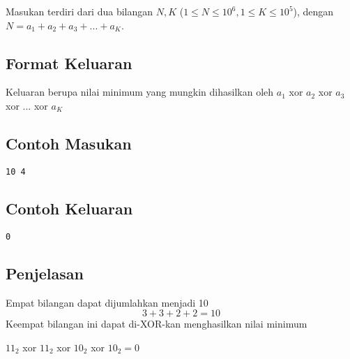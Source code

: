 \documentclass{article}
\begin{document}
Masukan terdiri dari dua bilangan  $N, K$ ($1 \leq N \leq 10^6, 1 \leq K \leq 10^5$), dengan $N = a_1 + a_2 + a_3 + ... + a_K$.

\subsection*{Format Keluaran}

Keluaran berupa nilai minimum yang mungkin dihasilkan oleh $a_1$ xor $a_2$ xor $a_3$ xor $...$ xor $a_K$
\\

\begin{multicols}{2}
\subsection*{Contoh Masukan}
\begin{lstlisting}
10 4
\end{lstlisting}
\columnbreak
\subsection*{Contoh Keluaran}
\begin{lstlisting}
0
\end{lstlisting}
\vfill
\null
\end{multicols}

\subsection*{Penjelasan}
Empat bilangan dapat dijumlahkan menjadi 10
\[ 3 + 3 + 2 + 2 = 10 \]
Keempat bilangan ini dapat di-XOR-kan menghasilkan nilai minimum
\begin{center}
$11_2$ xor $11_2$ xor $10_2$ xor $10_2 = 0$
\end{center}
\pagebreak
\end{document}
